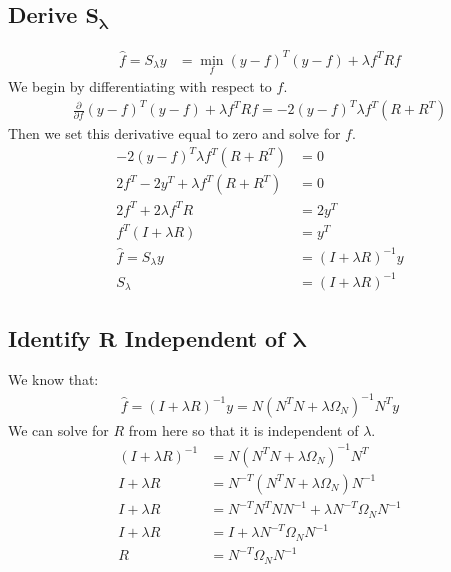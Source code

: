 \documentclass[a4paper]{article}
\begin{document}
\subsection{Derive $\mathbf{S_\lambda}$}
\begin{align*}
  \hat{f} = S_\lambda y &= \min_f (y-f)^T(y-f) + \lambda f^TRf
\end{align*}
We begin by differentiating with respect to $f$.
\begin{align*}
  \frac{\partial}{\partial f} (y-f)^T(y-f) + \lambda f^TRf
   = -2(y-f)^T \lambda f^T(R + R^T)
\end{align*}
Then we set this derivative equal to zero and solve for $f$.
\begin{align*}
  -2(y-f)^T \lambda f^T(R + R^T) &= 0\\
  2f^T - 2y^T + \lambda f^T(R + R^T) &= 0\\
  2f^T + 2\lambda f^TR &= 2y^T\\
  f^T(I + \lambda R) &= y^T\\
  \hat{f} = S_\lambda y &= (I + \lambda R)^{-1}y\\
  S_\lambda &= (I + \lambda R)^{-1}
\end{align*}
\subsection{Identify $\mathbf{R}$ Independent of $\mathbf{\lambda}$}
We know that:
\begin{align*}
  \hat{f} = (I + \lambda R)^{-1}y = N(N^TN + \lambda\Omega_N)^{-1}N^Ty
\end{align*}
We can solve for $R$ from here so that it is independent of $\lambda$.
\begin{align*}
  (I + \lambda R)^{-1} &= N(N^TN + \lambda\Omega_N)^{-1}N^T\\
  I + \lambda R &= N^{-T}(N^TN + \lambda \Omega_N) N^{-1}\\
  I + \lambda R  &= N^{-T}N^TNN^{-1} + \lambda N^{-T}\Omega_NN^{-1}\\
  I + \lambda R &= I + \lambda N^{-T}\Omega_NN^{-1}\\
  R &= N^{-T}\Omega_NN^{-1}
\end{align*}
\end{document}
